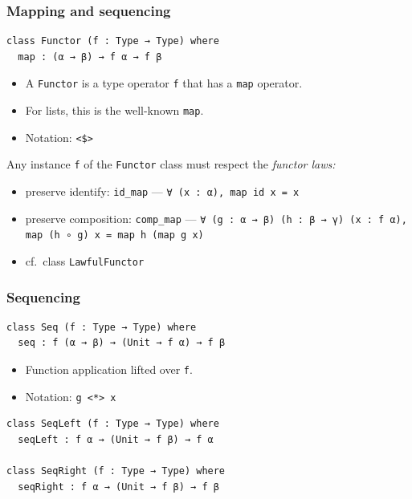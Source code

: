 \documentclass{beamer}
\begin{document}
\begin{frame}[fragile]
  \frametitle{Mapping and sequencing}
\begin{lstlisting}
class Functor (f : Type → Type) where
  map : (α → β) → f α → f β
\end{lstlisting}
  \begin{itemize}
  \item A \lstinline{Functor} is a type operator \lstinline{f} that has a \lstinline{map}
    operator.
  \item For lists, this is the well-known \lstinline{map}.
  \item Notation: \verb|<$>|
  \end{itemize}
  Any instance \lstinline{f} of the \lstinline{Functor} class must respect the \emph{functor laws:}
  \begin{itemize}
  \item preserve identify: \lstinline{id_map} --- \lstinline|∀ (x : α), map id x = x|
  \item preserve composition: \lstinline{comp_map} ---
    \lstinline{∀ (g : α → β) (h : β → γ) (x : f α), map (h ∘ g) x = map h (map g x)}
  \item cf.\ class \lstinline{LawfulFunctor}
  \end{itemize}
\end{frame}
\begin{frame}[fragile]
  \frametitle{Sequencing}
\begin{lstlisting}
class Seq (f : Type → Type) where
  seq : f (α → β) → (Unit → f α) → f β
\end{lstlisting}
  \begin{itemize}
  \item Function application lifted over \lstinline{f}.
  \item Notation: \lstinline{g <*> x}
  \end{itemize}
\begin{lstlisting}  
class SeqLeft (f : Type → Type) where
  seqLeft : f α → (Unit → f β) → f α

class SeqRight (f : Type → Type) where
  seqRight : f α → (Unit → f β) → f β
\end{lstlisting}
  
\end{frame}
\end{document}
